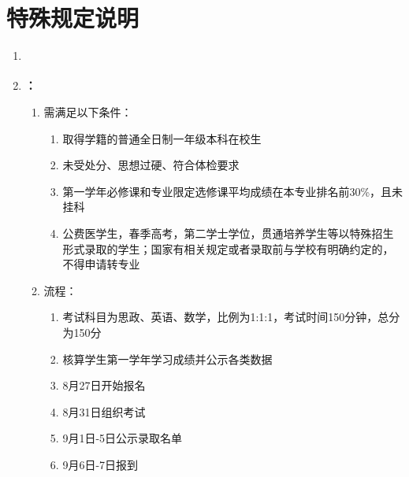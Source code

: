 \section[特殊说明]{特殊规定说明}
\begin{enumerate}
      \item \textbf{}
      \item \textbf{\footnotemark：}
            \begin{enumerate}
                  \item 需满足以下条件：
                        \begin{enumerate}
                              \item 取得学籍的普通全日制一年级本科在校生
                              \item 未受处分、思想过硬、符合体检要求
                              \item 第一学年必修课和专业限定选修课平均成绩在本专业排名前30\%，且未挂科
                              \item 公费医学生，春季高考，第二学士学位，贯通培养学生等以特殊招生形式录取的学生；国家有相关规定或者录取前与学校有明确约定的，不得申请转专业
                        \end{enumerate}
                  \item 流程：
                        \begin{enumerate}
                              \item 考试科目为思政、英语、数学，比例为1:1:1，考试时间150分钟，总分为150分
                              \item 核算学生第一学年学习成绩并公示各类数据
                              \item 8月27日开始报名
                              \item 8月31日组织考试
                              \item 9月1日-5日公示录取名单\footnotemark
                              \item 9月6日-7日报到
                        \end{enumerate}
            \end{enumerate}

\end{enumerate}
